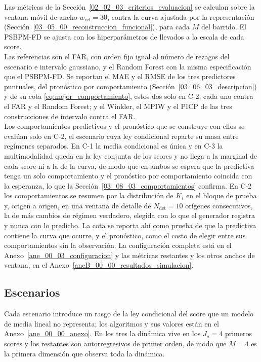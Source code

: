 Las métricas de la Sección~\ref{02_02_03_criterios_evaluacion} se calculan sobre la ventana móvil de ancho $w_{\mathrm{ref}} = 30$, contra la curva ajustada por la representación (Sección~\ref{03_05_00_reconstruccion_funcional}), para cada $M$ del barrido. El PSBPM-FD se ajusta con los hiperparámetros de \citet{03_02_chung2009nonparametric} llevados a la escala de cada score.\\

Las referencias son el FAR, con orden fijo igual al número de rezagos del escenario e intervalo gaussiano, y el Random Forest con la misma especificación que el PSBPM-FD. Se reportan el MAE y el RMSE de los tres predictores puntuales, del pronóstico por comportamiento (Sección~\ref{03_06_03_descripcion}) y de su cota \eqref{eq:mejor_comportamiento}, estos dos solo en C-2, cada uno contra el FAR y el Random Forest; y el Winkler, el MPIW y el PICP de las tres construcciones de intervalo contra el FAR.\\

Los comportamientos predictivos y el pronóstico que se construye con ellos se evalúan solo en C-2, el escenario cuya ley condicional reparte su masa entre regímenes separados. En C-1 la media condicional es única y en C-3 la multimodalidad queda en la ley conjunta de los scores y no llega a la marginal de cada score ni a la de la curva, de modo que en ambos se espera que la predictiva tenga un solo comportamiento y el pronóstico por comportamiento coincida con la esperanza, lo que la Sección~\ref{03_08_03_comportamientos} confirma. En C-2 los comportamientos se resumen por la distribución de $K_t$ en el bloque de prueba y, origen a origen, en una ventana de detalle de $N_{\mathrm{det}} = 10$ orígenes consecutivos, la de más cambios de régimen verdadero, elegida con lo que el generador registra y nunca con lo predicho. La cota se reporta ahí como prueba de que la predictiva contiene la curva que ocurre, y el pronóstico, como el costo de elegir entre sus comportamientos sin la observación. La configuración completa está en el Anexo~\ref{ane_00_03_configuracion} y las métricas restantes y los otros anchos de ventana, en el Anexo~\ref{aneB_00_00_resultados_simulacion}.

\subsection{Escenarios}
\label{03_07_02_escenarios}

Cada escenario introduce un rasgo de la ley condicional del score que un modelo de media lineal no representa; los algoritmos y sus valores están en el Anexo~\ref{ane_00_00_anexo}. En los tres la dinámica vive en los $J_a = 4$ primeros scores y los restantes son autorregresivos de primer orden, de modo que $M = 4$ es la primera dimensión que observa toda la dinámica.\\

